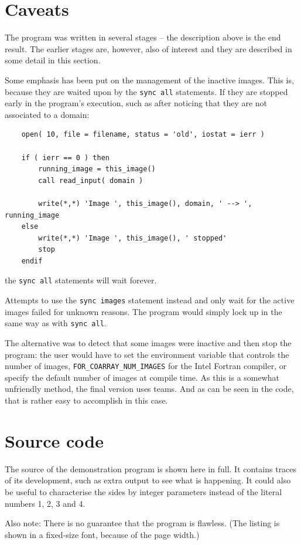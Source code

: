 \documentclass[onecolumn]{article}
\begin{document}
\section{Caveats}
The program was written in several stages -- the description above is the end result. The earlier stages are, however, also of interest and
they are described in some detail in this section.

Some emphasis has been put on the management of the inactive images. This is, because they are waited upon by the \verb+sync all+ statements.
If they are stopped early in the program's execution, such as after noticing that they are not associated to a domain:
\begin{lstlisting}
    open( 10, file = filename, status = 'old', iostat = ierr )

    if ( ierr == 0 ) then
        running_image = this_image()
        call read_input( domain )

        write(*,*) 'Image ', this_image(), domain, ' --> ', running_image
    else
        write(*,*) 'Image ', this_image(), ' stopped'
        stop
    endif
\end{lstlisting}
\noindent the \verb+sync all+ statements will wait forever.

Attempts to use the \verb+sync images+ statement instead and only wait for the active images failed for unknown reasons. The program would
simply lock up in the same way as with \verb+sync all+.

The alternative was to detect that some images were inactive and then stop the program: the user would have to set the environment variable
that controls the number of images, \verb+FOR_COARRAY_NUM_IMAGES+ for the Intel Fortran compiler, or specify the default number of images at
compile time. As this is a somewhat unfriendly method, the final version uses teams. And as can be seen in the code, that is rather easy
to accomplish in this case.


\appendix
\section{Source code}
The source of the demonstration program is shown here in full. It contains traces of its development, such as extra output to see what is happening.
It could also be useful to characterise the sides by integer parameters instead of the literal numbers 1, 2, 3 and 4.

Also note: There is no guarantee that the program is flawless. (The listing is shown in a fixed-size font, because of the page width.)
\end{document}
